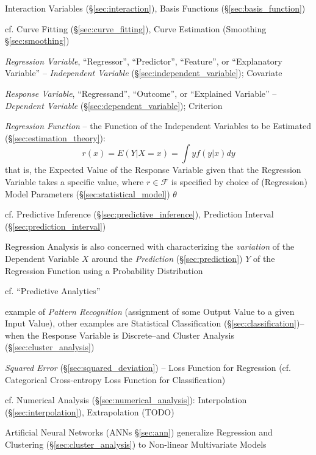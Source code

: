 Interaction Variables (\S\ref{sec:interaction}), Basis Functions
(\S\ref{sec:basis_function})

\fist cf. Curve Fitting (\S\ref{sec:curve_fitting}), Curve Estimation (Smoothing
\S\ref{sec:smoothing})

\emph{Regression Variable}, ``Regressor'', ``Predictor'', ``Feature'', or
``Explanatory Variable'' -- \emph{Independent Variable}
(\S\ref{sec:independent_variable}); Covariate

\emph{Response Variable}, ``Regressand'', ``Outcome'', or ``Explained Variable''
-- \emph{Dependent Variable} (\S\ref{sec:dependent_variable}); Criterion

\emph{Regression Function} -- the Function of the Independent Variables to be
Estimated (\S\ref{sec:estimation_theory}):
\[
  r(x) = E(Y | X = x) = \int y f(y|x) dy
\]
that is, the Expected Value of the Response Variable given that the Regression
Variable takes a specific value, where $r \in \mathcal{F}$ is specified by
choice of (Regression) Model Parameters (\S\ref{sec:statistical_model}) $\theta$

\fist cf. Predictive Inference (\S\ref{sec:predictive_inference}),
Prediction Interval (\S\ref{sec:prediction_interval})

Regression Analysis is also concerned with characterizing the \emph{variation}
of the Dependent Variable $X$ around the \emph{Prediction}
(\S\ref{sec:prediction}) $Y$ of the Regression Function using a Probability
Distribution

cf. ``Predictive Analytics''

example of \emph{Pattern Recognition} (assignment of some Output Value to a
given Input Value), other examples are Statistical Classification
(\S\ref{sec:classification})--when the Response Variable is
Discrete--and Cluster Analysis (\S\ref{sec:cluster_analysis})

\emph{Squared Error} (\S\ref{sec:squared_deviation}) -- Loss Function for
Regression (cf. Categorical Cross-entropy Loss Function for Classification)

cf. Numerical Analysis (\S\ref{sec:numerical_analysis}): Interpolation
(\S\ref{sec:interpolation}), Extrapolation (TODO)

\fist Artificial Neural Networks (ANNs \S\ref{sec:ann}) generalize Regression
and Clustering (\S\ref{sec:cluster_analysis}) to Non-linear Multivariate Models

